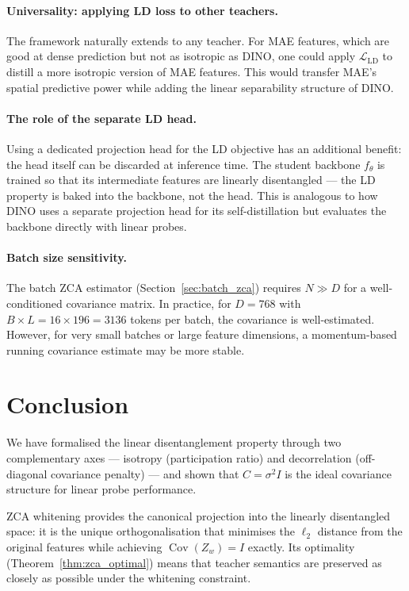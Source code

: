 \documentclass[11pt,a4paper]{article}
\newcommand{\calL}{\mathcal{L}}
\newcommand{\Cov}{\operatorname{Cov}}
\begin{document}
\paragraph{Universality: applying LD loss to other teachers.}
The framework naturally extends to any teacher.  For MAE features, which are
good at dense prediction but not as isotropic as DINO, one could apply
$\calL_{\mathrm{LD}}$ to distill a more isotropic version of MAE features.
This would transfer MAE's spatial predictive power while adding the linear
separability structure of DINO.

\paragraph{The role of the separate LD head.}
Using a dedicated projection head for the LD objective has an additional
benefit: the head itself can be discarded at inference time.
The student backbone $f_\theta$ is trained so that its intermediate features
are linearly disentangled — the LD property is baked into the backbone, not the
head.
This is analogous to how DINO uses a separate projection head for its
self-distillation but evaluates the backbone directly with linear probes.

\paragraph{Batch size sensitivity.}
The batch ZCA estimator (Section~\ref{sec:batch_zca}) requires $N \gg D$ for a
well-conditioned covariance matrix.  In practice, for $D = 768$ with
$B \times L = 16 \times 196 = 3136$ tokens per batch, the covariance is
well-estimated.  However, for very small batches or large feature dimensions,
a momentum-based running covariance estimate may be more stable.

\section{Conclusion}
\label{sec:conclusion}

We have formalised the linear disentanglement property through two
complementary axes — isotropy (participation ratio) and decorrelation
(off-diagonal covariance penalty) — and shown that $C = \sigma^2 I$ is the
ideal covariance structure for linear probe performance.

ZCA whitening provides the canonical projection into the linearly disentangled
space: it is the unique orthogonalisation that minimises the $\ell_2$ distance
from the original features while achieving $\Cov(Z_w) = I$ exactly.  Its
optimality (Theorem~\ref{thm:zca_optimal}) means that teacher semantics are
preserved as closely as possible under the whitening constraint.
\end{document}

